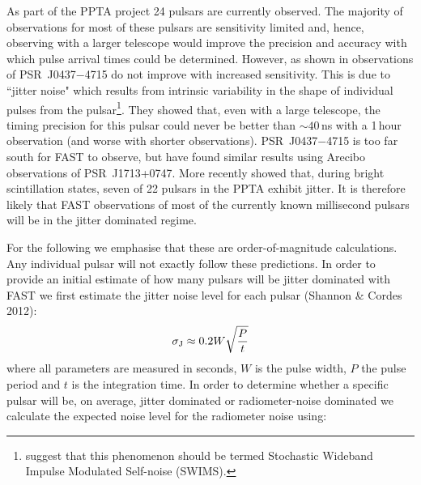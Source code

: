 \documentclass{raa}            %
\begin{document}
As part of the PPTA project 24 pulsars are currently observed.  The majority of observations for most of these pulsars are sensitivity limited and, hence, observing with a larger telescope would improve the precision and accuracy with which pulse arrival times could be determined.  However, as shown in \cite{ovh+11} observations of PSR~J0437$-$4715 do not improve with increased sensitivity.  This is due to ``jitter noise" which results from intrinsic variability in the shape of individual pulses from the pulsar\footnote{\cite{ovh+11} suggest that this phenomenon should be termed Stochastic Wideband Impulse Modulated Self-noise (SWIMS).}.  They showed that, even with a large telescope, the timing precision for this pulsar could never be better than $\sim 40$\,ns with a 1\,hour observation (and worse with shorter observations).  PSR~J0437$-$4715 is too far south for FAST to observe, but \cite{sc12} have found similar results using Arecibo observations of PSR~J1713+0747.  More recently \cite{sod+14} showed that, during bright scintillation states, seven of 22 pulsars in the PPTA exhibit jitter.   It is therefore likely that FAST observations of most of the currently known millisecond pulsars will be in the jitter dominated regime.  

For the following we emphasise that these are order-of-magnitude calculations.  Any individual pulsar will not exactly follow these predictions. In order to provide an initial estimate of how many pulsars will be jitter dominated with FAST we first estimate the jitter noise level for each pulsar (Shannon \& Cordes 2012):
\begin{equation}\label{eqn:jitter}
\sigma_{\rm J} \approx 0.2 W \sqrt{\frac{P}{t}}
\end{equation}
where all parameters are measured in seconds, $W$ is the pulse width, $P$ the pulse period and $t$ is the integration time.  In order to determine whether a specific pulsar will be, on average, jitter dominated or radiometer-noise dominated we calculate the expected noise level for the radiometer noise using:
\end{document}
